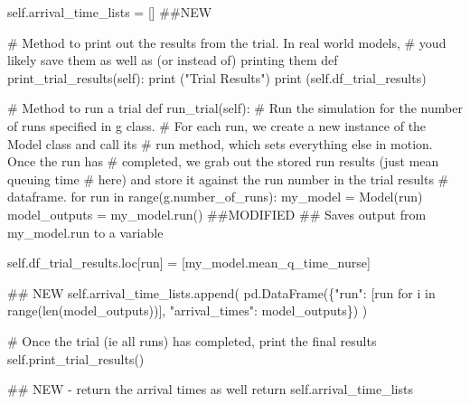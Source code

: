 \documentclass[
  letterpaper,
  DIV=11,
  numbers=noendperiod]{scrreprt}
\newenvironment{Shaded}{\begin{snugshade}}{\end{snugshade}}
\newcommand{\BuiltInTok}[1]{\textcolor[rgb]{0.00,0.23,0.31}{#1}}
\newcommand{\CommentTok}[1]{\textcolor[rgb]{0.37,0.37,0.37}{#1}}
\newcommand{\ControlFlowTok}[1]{\textcolor[rgb]{0.00,0.23,0.31}{#1}}
\newcommand{\KeywordTok}[1]{\textcolor[rgb]{0.00,0.23,0.31}{#1}}
\newcommand{\NormalTok}[1]{\textcolor[rgb]{0.00,0.23,0.31}{#1}}
\newcommand{\OperatorTok}[1]{\textcolor[rgb]{0.37,0.37,0.37}{#1}}
\newcommand{\StringTok}[1]{\textcolor[rgb]{0.13,0.47,0.30}{#1}}
\newcommand{\VariableTok}[1]{\textcolor[rgb]{0.07,0.07,0.07}{#1}}
\begin{document}
\begin{tcolorbox}
\begin{Shaded}
\begin{Highlighting}[]
        \VariableTok{self}\NormalTok{.arrival\_time\_lists }\OperatorTok{=}\NormalTok{ [] }\CommentTok{\#\#NEW}

    \CommentTok{\# Method to print out the results from the trial.  In real world models,}
    \CommentTok{\# you\textquotesingle{}d likely save them as well as (or instead of) printing them}
    \KeywordTok{def}\NormalTok{ print\_trial\_results(}\VariableTok{self}\NormalTok{):}
        \BuiltInTok{print}\NormalTok{ (}\StringTok{"Trial Results"}\NormalTok{)}
        \BuiltInTok{print}\NormalTok{ (}\VariableTok{self}\NormalTok{.df\_trial\_results)}

    \CommentTok{\# Method to run a trial}
    \KeywordTok{def}\NormalTok{ run\_trial(}\VariableTok{self}\NormalTok{):}
        \CommentTok{\# Run the simulation for the number of runs specified in g class.}
        \CommentTok{\# For each run, we create a new instance of the Model class and call its}
        \CommentTok{\# run method, which sets everything else in motion.  Once the run has}
        \CommentTok{\# completed, we grab out the stored run results (just mean queuing time}
        \CommentTok{\# here) and store it against the run number in the trial results}
        \CommentTok{\# dataframe.}
        \ControlFlowTok{for}\NormalTok{ run }\KeywordTok{in} \BuiltInTok{range}\NormalTok{(g.number\_of\_runs):}
\NormalTok{            my\_model }\OperatorTok{=}\NormalTok{ Model(run)}
\NormalTok{            model\_outputs }\OperatorTok{=}\NormalTok{ my\_model.run() }\CommentTok{\#\#MODIFIED}
            \CommentTok{\#\# Saves output from my\_model.run to a variable}

            \VariableTok{self}\NormalTok{.df\_trial\_results.loc[run] }\OperatorTok{=}\NormalTok{ [my\_model.mean\_q\_time\_nurse]}

            \CommentTok{\#\# NEW}
            \VariableTok{self}\NormalTok{.arrival\_time\_lists.append(}
\NormalTok{              pd.DataFrame(\{}\StringTok{"run"}\NormalTok{: [run }\ControlFlowTok{for}\NormalTok{ i }\KeywordTok{in} \BuiltInTok{range}\NormalTok{(}\BuiltInTok{len}\NormalTok{(model\_outputs))], }\StringTok{"arrival\_times"}\NormalTok{: model\_outputs\})}
\NormalTok{              )}

        \CommentTok{\# Once the trial (ie all runs) has completed, print the final results}
        \VariableTok{self}\NormalTok{.print\_trial\_results()}

        \CommentTok{\#\# NEW {-} return the arrival times as well}
        \ControlFlowTok{return} \VariableTok{self}\NormalTok{.arrival\_time\_lists}
\end{Highlighting}
\end{Shaded}

\end{tcolorbox}
\end{document}
